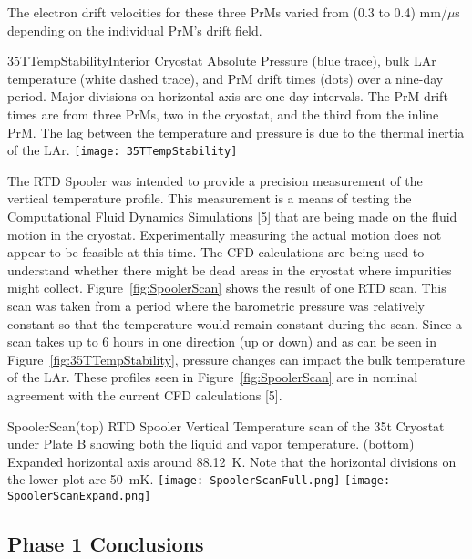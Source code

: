 The electron drift velocities for these three PrMs varied from (0.3 to 0.4) mm/$\mu$s depending on the individual PrM's drift field. 

\begin{cdrfigure}{35TTempStability}{Interior Cryostat Absolute Pressure 
(blue trace), bulk LAr temperature (white dashed trace), and PrM drift times (dots) over a nine-day period. 
Major divisions on horizontal axis are one day intervals. The PrM drift times are from three PrMs, two in 
the cryostat, and the third from the inline PrM. The lag between the temperature and pressure is due to 
the thermal inertia of the LAr.}
  \texttt{[image: 35TTempStability]}
\end{cdrfigure}

The RTD Spooler was intended to provide a precision measurement of the vertical temperature profile. 
This measurement is a means of testing the Computational Fluid Dynamics Simulations [5] that 
are being made on the fluid motion in the cryostat. Experimentally measuring the actual motion does not 
appear to be feasible at this time. The CFD calculations are being used to understand whether there 
might be dead areas in the cryostat where impurities might collect. Figure~\ref{fig:SpoolerScan} shows the result of one RTD 
scan. This scan was taken from a period where the barometric pressure was relatively constant so that 
the temperature would remain constant during the scan. Since a scan takes up to 6 hours in one direction 
(up or down) and as can be seen in Figure~\ref{fig:35TTempStability}, pressure changes can impact the 
bulk temperature of the LAr. These profiles seen in Figure~\ref{fig:SpoolerScan} are in nominal 
agreement with the current CFD calculations [5].


\begin{cdrfigure}{SpoolerScan}{(top) RTD Spooler Vertical Temperature scan of the 35t Cryostat under Plate B showing both the liquid and vapor temperature.  (bottom) Expanded horizontal axis around 88.12~K. Note that the horizontal divisions on the lower plot are 50~mK. }
\texttt{[image: SpoolerScanFull.png]}
\texttt{[image: SpoolerScanExpand.png]}  
\end{cdrfigure}

\subsection{Phase 1 Conclusions}

